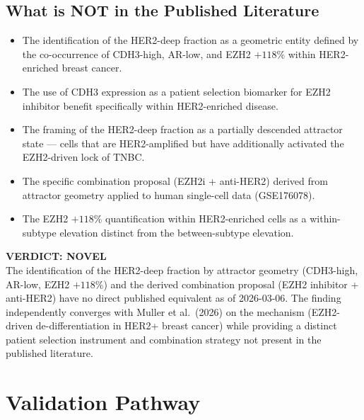 \documentclass[12pt, a4paper]{article}
\begin{document}
\subsection{What is NOT in the Published
Literature}

\begin{itemize}
    \item The identification of the
    HER2-deep fraction as a geometric
    entity defined by the co-occurrence
    of CDH3-high, AR-low, and
    EZH2 $+118\%$ within HER2-enriched
    breast cancer.
    \item The use of CDH3 expression as
    a patient selection biomarker for
    EZH2 inhibitor benefit specifically
    within HER2-enriched disease.
    \item The framing of the HER2-deep
    fraction as a partially descended
    attractor state --- cells that are
    HER2-amplified but have additionally
    activated the EZH2-driven lock of
    TNBC.
    \item The specific combination
    proposal (EZH2i + anti-HER2) derived
    from attractor geometry applied to
    human single-cell data (GSE176078).
    \item The EZH2 $+118\%$ quantification
    within HER2-enriched cells as a
    within-subtype elevation distinct
    from the between-subtype elevation.
\end{itemize}

\begin{center}
\colorbox{novelbox}{
\begin{minipage}{0.88\textwidth}
\vspace{0.5em}
\textbf{VERDICT: NOVEL}\\[0.3em]
The identification of the HER2-deep fraction
by attractor geometry (CDH3-high, AR-low,
EZH2 $+118\%$) and the derived combination
proposal (EZH2 inhibitor + anti-HER2) have
no direct published equivalent as of
2026-03-06. The finding independently
converges with Muller et al.\ (2026) on
the mechanism (EZH2-driven
de-differentiation in HER2+ breast cancer)
while providing a distinct patient selection
instrument and combination strategy not
present in the published literature.
\vspace{0.5em}
\end{minipage}}
\end{center}

\section{Validation Pathway}
\end{document}
